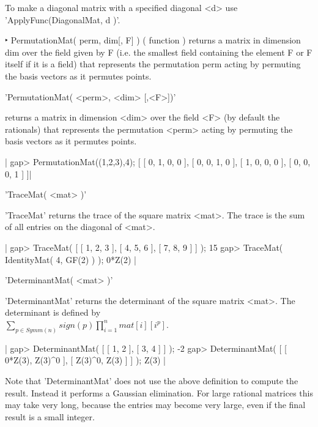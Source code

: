 To make a diagonal matrix with a specified diagonal <d> use
'ApplyFunc(DiagonalMat, d )'.

‣ PermutationMat( perm, dim[, F] )	( function )
returns a matrix in dimension dim over the field given by F (i.e. the smallest field containing the element F or F itself if it is a field) that represents the permutation perm acting by permuting the basis vectors as it permutes points.

%

'PermutationMat( <perm>, <dim> [,<F>])'

returns  a matrix  in dimension  <dim> over  the field  <F> (by default the
rationals)  that represents the permutation  <perm> acting by permuting the
basis vectors as it permutes points.

|    gap> PermutationMat((1,2,3),4);
    [ [ 0, 1, 0, 0 ], [ 0, 0, 1, 0 ], [ 1, 0, 0, 0 ], [ 0, 0, 0, 1 ] ]|


'TraceMat( <mat> )'

'TraceMat' returns  the trace  of the square matrix <mat>.   The trace is
the sum of all entries on the diagonal of <mat>.

|    gap> TraceMat( [ [ 1, 2, 3 ], [ 4, 5, 6 ], [ 7, 8, 9 ] ] );
    15
    gap> TraceMat( IdentityMat( 4, GF(2) ) );
    0*Z(2) |


'DeterminantMat( <mat> )'

'DeterminantMat' returns the determinant of the square matrix <mat>.  The
determinant is defined by\\
$\sum_{p \in Symm(n)}{sign(p)\prod_{i=1}^{n}{mat[i][i^p]}}$.

|    gap> DeterminantMat( [ [ 1, 2 ], [ 3, 4 ] ] );
    -2
    gap> DeterminantMat( [ [ 0*Z(3), Z(3)^0 ], [ Z(3)^0, Z(3) ] ] );
    Z(3) |

Note that 'DeterminantMat' does not use  the above  definition to compute
the  result.   Instead  it  performs a Gaussian  elimination.   For large
rational matrices this may take very long, because the entries may become
very large, even if the final result is a small integer.


